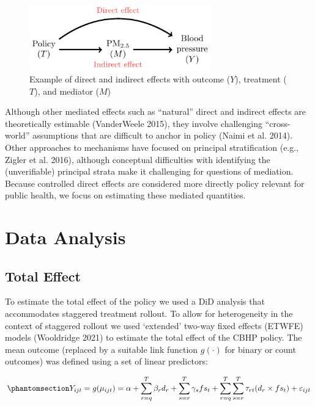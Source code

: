 \documentclass[
  letterpaper,
  DIV=11,
  numbers=noendperiod]{scrartcl}
\begin{document}
\begin{figure}

{\centering \includegraphics[width=0.7\textwidth,height=\textheight]{hei-report_files/figure-pdf/dag1-1.pdf}

}

\caption{Example of direct and indirect effects with outcome (\(Y\)),
treatment (\(T\)), and mediator (\(M\))}

\end{figure}%

Although other mediated effects such as ``natural'' direct and indirect
effects are theoretically estimable (VanderWeele 2015), they involve
challenging ``cross-world'' assumptions that are difficult to anchor in
policy (Naimi et al. 2014). Other approaches to mechanisms have focused
on principal stratification (e.g., Zigler et al. 2016), although
conceptual difficulties with identifying the (unverifiable) principal
strata make it challenging for questions of mediation. Because
controlled direct effects are considered more directly policy relevant
for public health, we focus on estimating these mediated quantities.

\section{Data Analysis}\label{data-analysis}

\subsection{Total Effect}\label{total-effect}

To estimate the total effect of the policy we used a DiD analysis that
accommodates staggered treatment rollout. To allow for heterogeneity in
the context of staggered rollout we used `extended' two-way fixed
effects (ETWFE) models (Wooldridge 2021) to estimate the total effect of
the CBHP policy. The mean outcome (replaced by a suitable link function
\(g(\cdot)\) for binary or count outcomes) was defined using a set of
linear predictors:

\begin{equation}\phantomsection\label{eq-etwfe}{Y_{ijt}=g(\mu_{ijt}) = \alpha + \sum_{r=q}^{T} \beta_{r} d_{r} + \sum_{s=r}^{T} \gamma_{s} fs_{t}+ \sum_{r=q}^{T} \sum_{s=r}^{T} \tau_{rt} (d_{r} \times fs_{t}) + \varepsilon_{ijt}}\end{equation}
\end{document}
